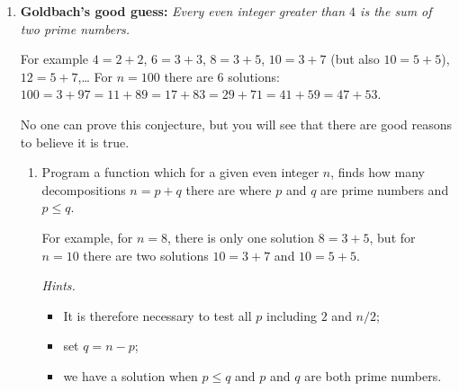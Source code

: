 \documentclass[11pt,class=report,crop=false]{standalone}
\begin{document}






\begin{activite}


\begin{enumerate}
  \item \textbf{Goldbach's good guess: } \emph{Every even integer greater than $4$ is the sum of two prime numbers.}

  For example $4 = 2+2$, $6=3+3$, $8=3+5$, $10=3+7$ (but also $10=5+5$), $12 = 5+7$,\ldots{}
  For $n=100$ there are $6$ solutions: $100=3+97=11+89=17+83=29+71=41+59=47+53$.
  
  No one can prove this conjecture, but you will see that there are good reasons to believe it is true.
  
  \begin{enumerate}
    \item Program a function  which for a given even integer $n$, finds how many decompositions $n=p+q$ there are where $p$ and $q$ are prime numbers and $p\le q$.
    
    For example, for $n=8$, there is only one solution $8=3+5$, but for $n=10$ there are two solutions $10 = 3+7$ and $10=5+5$.
 
   \emph{Hints.} 
   \begin{itemize}
     \item It is therefore necessary to test all $p$ including $2$ and $n/2$;
     \item set $q = n - p$;
     \item we have a solution when $p \le q$ and $p$ and $q$ are both prime numbers.
   \end{itemize}
   

\end{enumerate}
\end{enumerate}
\end{activite}
\end{document}
